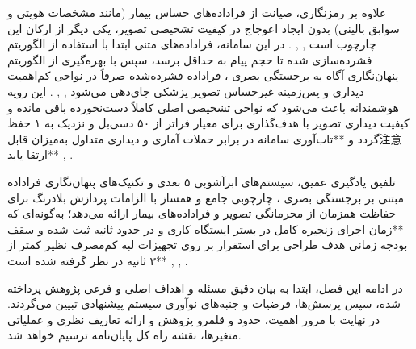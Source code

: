 

علاوه بر رمزنگاری، صیانت از فراداده‌های حساس بیمار (مانند مشخصات هویتی و سوابق بالینی) بدون ایجاد اعوجاج در کیفیت تشخیصی تصویر، یکی دیگر از ارکان این چارچوب است , , . در این سامانه، فراداده‌های متنی ابتدا با استفاده از الگوریتم  فشرده‌سازی شده تا حجم پیام به حداقل برسد، سپس با بهره‌گیری از الگوریتم پنهان‌نگاری آگاه به برجستگی بصری ، فراداده فشرده‌شده صرفاً در نواحی کم‌اهمیت دیداری و پس‌زمینه غیرحساس تصویر پزشکی جای‌دهی می‌شود , , . این رویه هوشمندانه باعث می‌شود که نواحی تشخیصی اصلی  کاملاً دست‌نخورده باقی مانده و کیفیت دیداری تصویر با هدف‌گذاری برای معیار  فراتر از ۵۰ دسی‌بل و  نزدیک به ۱ حفظ گردد و **تاب‌آوری سامانه در برابر حملات آماری و دیداری متداول به‌میزان قابل‌注意 ارتقا یابد** , .\par



تلفیق یادگیری عمیق، سیستم‌های ابرآشوبی ۵ بعدی و تکنیک‌های پنهان‌نگاری فراداده مبتنی بر برجستگی بصری ، چارچوبی جامع و همساز با الزامات پردازش بلادرنگ برای حفاظت همزمان از محرمانگی تصویر و فراداده‌های بیمار ارائه می‌دهد؛ به‌گونه‌ای که **زمان اجرای زنجیره کامل در بستر ایستگاه کاری و  در حدود  ثانیه ثبت شده و سقف بودجه زمانی هدف طراحی برای استقرار بر روی تجهیزات لبه کم‌مصرف نظیر  کمتر از ۳ ثانیه در نظر گرفته شده است** , , .\par



در ادامه این فصل، ابتدا به بیان دقیق مسئله و اهداف اصلی و فرعی پژوهش پرداخته شده، سپس پرسش‌ها، فرضیات و جنبه‌های نوآوری سیستم پیشنهادی تبیین می‌گردند. در نهایت با مرور اهمیت، حدود و قلمرو پژوهش و ارائه تعاریف نظری و عملیاتی متغیرها، نقشه راه کل پایان‌نامه ترسیم خواهد شد.\par



